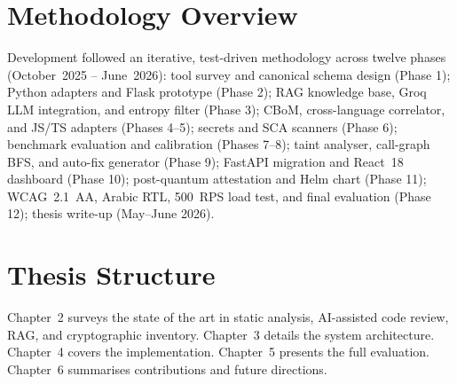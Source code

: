 \section{Methodology Overview}
\label{sec:methodology}

Development followed an iterative, test-driven methodology across twelve phases (October~2025 -- June~2026): tool survey and canonical schema design (Phase 1); Python adapters and Flask prototype (Phase 2); RAG knowledge base, Groq LLM integration, and entropy filter (Phase 3); CBoM, cross-language correlator, and JS/TS adapters (Phases 4--5); secrets and SCA scanners (Phase 6); benchmark evaluation and calibration (Phases 7--8); taint analyser, call-graph BFS, and auto-fix generator (Phase 9); FastAPI migration and React~18 dashboard (Phase 10); post-quantum attestation and Helm chart (Phase 11); WCAG~2.1~AA, Arabic RTL, 500~RPS load test, and final evaluation (Phase 12); thesis write-up (May--June 2026).

\section{Thesis Structure}
\label{sec:structure}

Chapter~2 surveys the state of the art in static analysis, AI-assisted code review, RAG, and cryptographic inventory. Chapter~3 details the system architecture. Chapter~4 covers the implementation. Chapter~5 presents the full evaluation. Chapter~6 summarises contributions and future directions.

\clearpage
